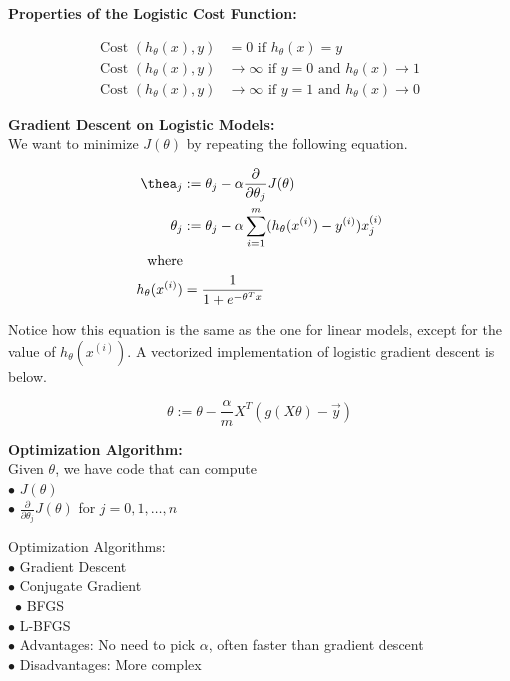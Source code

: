\documentclass{article}
\begin{document}
        \noindent \textbf{Properties of the Logistic Cost Function:}

        \begin{align*}
            \text{Cost }(h_{\theta}(x),y)   &= 0 \text{ if } h_{\theta}(x) = y \\
            \text{Cost }(h_{\theta}(x),y)   &\to\infty \text{ if } y=0 \text{ and } h_{\theta}(x)\to 1 \\
            \text{Cost }(h_{\theta}(x),y)   &\to\infty \text{ if } y=1 \text{ and } h_{\theta}(x)\to 0
        \end{align*}

        \noindent \textbf{Gradient Descent on Logistic Models:} \\

        \noindent We want to minimize $J(\theta)$ by repeating the following equation.

        \begin{align*}
            \thea_j     &:= \theta_j-\alpha\frac{\partial}{\partial\theta_j}J(\theta) \\
            \theta_j    &:= \theta_j-\alpha\sum^m_{i=1} (h_{\theta}(x^{(i)})-y^{(i)})x_j^{(i)} \\
            \text{where} \\
            h_{\theta}(x^{(i)}) &= \frac{1}{1+e^{-\theta^T x}}
        \end{align*}

        \noindent Notice how this equation is the same as the one for linear models, except for the value of
        $h_{\theta}(x^{(i)})$. A vectorized implementation of logistic gradient descent is below.

        \begin{equation*}
            \theta := \theta - \frac{\alpha}{m} X^T (g(X\theta)-\overrightarrow{y})
        \end{equation*}

        \pagebreak

        \noindent \textbf{Optimization Algorithm:} \\
        Given $\theta$, we have code that can compute \\
        $\bullet$ $J(\theta)$ \\
        $\bullet$ $\frac{\partial}{\partial\theta_j}J(\theta)$ for $j=0,1,\dots,n$

        \noindent Optimization Algorithms: \\
        $\bullet$ Gradient Descent \\
        $\bullet$ Conjugate Gradient \\\
        $\bullet$ BFGS \\
        $\bullet$ L-BFGS \\
        $\bullet$ Advantages: No need to pick $\alpha$, often faster than gradient descent \\
        $\bullet$ Disadvantages: More complex \\
\end{document}
